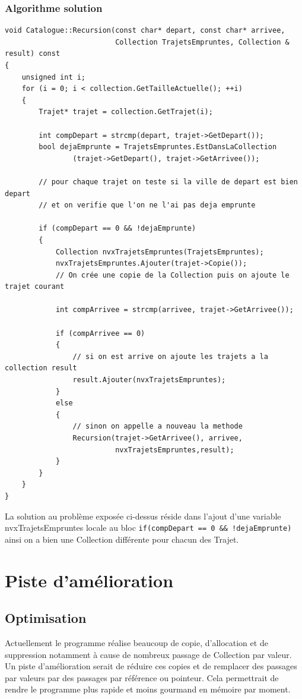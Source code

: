 \documentclass[10pt,a4paper,twoside]{article}
\begin{document}
\subsubsection{Algorithme solution}
\begin{verbatim}
void Catalogue::Recursion(const char* depart, const char* arrivee,
                          Collection TrajetsEmpruntes, Collection & result) const
{
    unsigned int i;
    for (i = 0; i < collection.GetTailleActuelle(); ++i)
    {
        Trajet* trajet = collection.GetTrajet(i);
        
        int compDepart = strcmp(depart, trajet->GetDepart());
        bool dejaEmprunte = TrajetsEmpruntes.EstDansLaCollection
                (trajet->GetDepart(), trajet->GetArrivee());
        
        // pour chaque trajet on teste si la ville de depart est bien depart
        // et on verifie que l'on ne l'ai pas deja emprunte
        
        if (compDepart == 0 && !dejaEmprunte)
        {
            Collection nvxTrajetsEmpruntes(TrajetsEmpruntes);
            nvxTrajetsEmpruntes.Ajouter(trajet->Copie());
            // On crée une copie de la Collection puis on ajoute le trajet courant
            
            int compArrivee = strcmp(arrivee, trajet->GetArrivee());
            
            if (compArrivee == 0)
            {
                // si on est arrive on ajoute les trajets a la collection result
                result.Ajouter(nvxTrajetsEmpruntes);
            }
            else
            {
                // sinon on appelle a nouveau la methode
                Recursion(trajet->GetArrivee(), arrivee,
                          nvxTrajetsEmpruntes,result);
            }
        }
    }
}
\end{verbatim}

La solution au problème exposée ci-dessus réside dans l'ajout d'une variable nvxTrajetsEmpruntes locale au bloc \verb$if(compDepart == 0 && !dejaEmprunte)$ ainsi on a bien une Collection différente pour chacun des Trajet.

\section{Piste d'amélioration}
\subsection{Optimisation}
Actuellement le programme réalise beaucoup de copie, d'allocation et de suppression notamment à cause de nombreux passage de Collection par valeur. Un piste d'amélioration serait de réduire ces copies et de remplacer des passages par valeurs par des passages par référence ou pointeur. Cela permettrait de rendre le programme plus rapide et moins gourmand en mémoire par moment.
\end{document}
